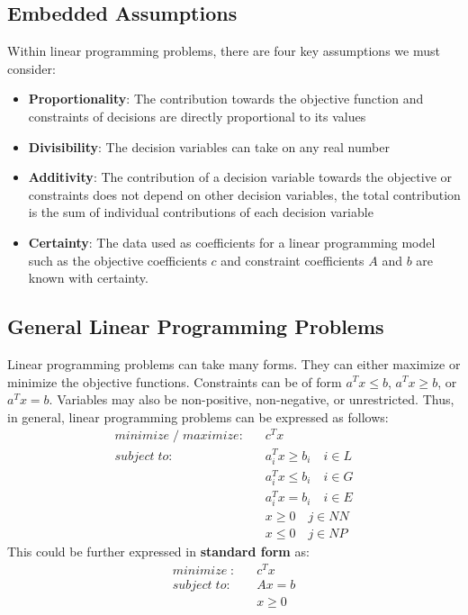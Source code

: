 \documentclass[11pt]{article}
\begin{document}
\subsection{Embedded Assumptions}
Within linear programming problems, there are four key assumptions we must consider: 
\begin{itemize}
\item \textbf{Proportionality}: The contribution towards the objective function and constraints of decisions are directly proportional to its values
\item \textbf{Divisibility}: The decision variables can take on any real number
\item \textbf{Additivity}: The contribution of a decision variable towards the objective or constraints does not depend on other decision variables,  the total contribution is the sum of individual contributions of each decision variable
\item \textbf{Certainty}: The data used as coefficients for a linear programming model such as the objective coefficients $c$ and constraint coefficients $A$ and $b$ are known with certainty.
\end{itemize}
\subsection{General Linear Programming Problems}
Linear programming problems can take many forms. They can either maximize or minimize the objective functions. Constraints can be of form $a^Tx\leq b$, $a^Tx\geq b$, or $a^Tx= b$. Variables may also be non-positive,  non-negative, or unrestricted. Thus, in general, linear programming problems can be expressed as follows:
\begin{align*}
minimize \; / \; maximize : & \; \; \; c^Tx \\ 
subject \; to : & \; \; \; a_i^Tx \geq b_i  \quad  i \in L \\
& \; \; \; a_i^Tx \leq b_i  \quad i \in G \\
& \; \; \; a_i^Tx = b_i  \quad i \in E \\
& \; \; \; x \geq 0  \quad j \in NN \\
& \; \; \; x \leq 0  \quad j \in NP 
\end{align*}
This could be further expressed in \textbf{standard form} as:
\begin{align*}
minimize \; : & \; \; \; c^Tx \\ 
subject \; to : & \; \; \; Ax = b \\
& \; \; \; x \geq 0 
\end{align*}
\end{document}
